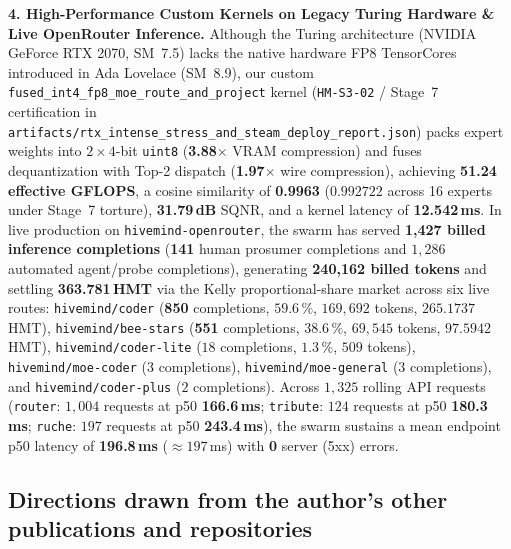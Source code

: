 \documentclass[11pt,a4paper]{article}
\begin{document}
\textbf{4. High-Performance Custom Kernels on Legacy Turing Hardware \& Live OpenRouter Inference.}
Although the Turing architecture (NVIDIA GeForce RTX 2070, SM~7.5) lacks the native hardware FP8 TensorCores introduced in Ada Lovelace (SM~8.9), our custom \texttt{fused\_int4\_fp8\_moe\_route\_and\_project} kernel (\texttt{HM-S3-02} / Stage~7 certification in \texttt{artifacts/rtx\_intense\_stress\_and\_steam\_deploy\_report.json}) packs expert weights into $2\times 4$-bit \texttt{uint8} (\textbf{3.88$\times$} VRAM compression) and fuses dequantization with Top-2 dispatch (\textbf{1.97$\times$} wire compression), achieving \textbf{51.24 effective GFLOPS}, a cosine similarity of \textbf{0.9963} ($0.992722$ across 16 experts under Stage~7 torture), \textbf{31.79\,dB} SQNR, and a kernel latency of \textbf{12.542\,ms}. In live production on \texttt{hivemind-openrouter}, the swarm has served \textbf{1{,}427 billed inference completions} (\textbf{141} human prosumer completions and $1{,}286$ automated agent/probe completions), generating \textbf{240{,}162 billed tokens} and settling \textbf{363.781\,HMT} via the Kelly proportional-share market across six live routes: \texttt{hivemind/coder} (\textbf{850} completions, $59.6\,\%$, $169{,}692$ tokens, $265.1737$\,HMT), \texttt{hivemind/bee-stars} (\textbf{551} completions, $38.6\,\%$, $69{,}545$ tokens, $97.5942$\,HMT), \texttt{hivemind/coder-lite} ($18$ completions, $1.3\,\%$, $509$ tokens), \texttt{hivemind/moe-coder} ($3$ completions), \texttt{hivemind/moe-general} ($3$ completions), and \texttt{hivemind/coder-plus} ($2$ completions). Across $1{,}325$ rolling API requests (\texttt{router}: $1{,}004$ requests at p50 \textbf{166.6\,ms}; \texttt{tribute}: $124$ requests at p50 \textbf{180.3\,ms}; \texttt{ruche}: $197$ requests at p50 \textbf{243.4\,ms}), the swarm sustains a mean endpoint p50 latency of \textbf{196.8\,ms} ($\approx 197$\,ms) with \textbf{0} server (5xx) errors.

\subsection{Directions drawn from the author's other publications and repositories}
\label{sec:directions}
\end{document}
